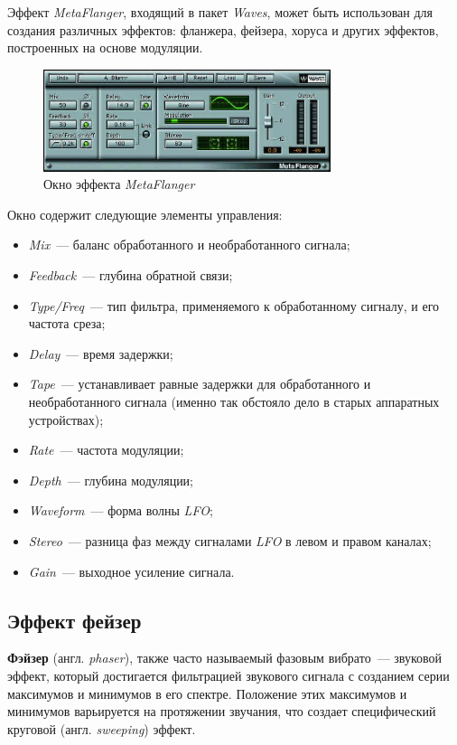 \documentclass[oneside, final, 14pt]{extreport}
\begin{document}
Эффект \emph{MetaFlanger}, входящий в пакет \emph{Waves}, может быть использован для создания различных эффектов: фланжера, фейзера, хоруса и других эффектов, построенных на основе модуляции.

\begin{figure}[h!]
  \centering
  \includegraphics[width=0.75\textwidth]{pic-metaflanger-01}
  \caption{Окно эффекта \emph{MetaFlanger}}
  \label{pic-metaflanger-01}
\end{figure}

Окно содержит следующие элементы управления:
\begin{itemize}
  \item \emph{Mix}~--- баланс обработанного и необработанного сигнала;
  \item \emph{Feedback}~--- глубина обратной связи;
  \item \emph{Type/Freq}~--- тип фильтра, применяемого к обработанному сигналу, и его частота среза;
  \item \emph{Delay}~--- время задержки;
  \item \emph{Tape}~--- устанавливает равные задержки для обработанного и необработанного сигнала (именно так обстояло дело в старых аппаратных устройствах);
  \item \emph{Rate}~--- частота модуляции;
  \item \emph{Depth}~--- глубина модуляции;
  \item \emph{Waveform}~--- форма волны \emph{LFO};
  \item \emph{Stereo}~--- разница фаз между сигналами \emph{LFO} в левом и правом каналах;
  \item \emph{Gain}~--- выходное усиление сигнала.
\end{itemize}

\subsection{Эффект фейзер}
\textbf{Фэйзер} (англ. \textit{phaser}), также часто называемый фазовым вибрато~--- звуковой эффект, который достигается фильтрацией звукового сигнала с созданием серии максимумов и минимумов в его спектре. Положение этих максимумов и минимумов варьируется на протяжении звучания, что создает специфический круговой (англ. \textit{sweeping}) эффект.
\end{document}
